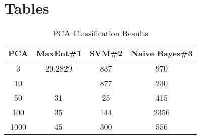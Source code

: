 \documentclass[]{article}
\title{}
\author{Sullivan, Cellier, Hobbs}
\begin{document}
\maketitle

\begin{abstract}

\end{abstract}

\section{Tables}
\begin{table}[ht] 
\caption{PCA Classification Results} %
\centering %
\begin{tabular}{c c c c} %
\hline\hline %
PCA & MaxEnt\#1 & SVM\#2 & Naive Bayes\#3 \\ [0.5ex] %
\hline %
3 & 29.2829 & 837 & 970 \\ %
10 &  & 877 & 230 \\ 
50 & 31 & 25 & 415 \\ 
100 & 35 & 144 & 2356 \\ 
1000 & 45 & 300 & 556 \\ [1ex] %
\hline %
\end{tabular} 
\label{table:nonlin} %
\end{table} 
\end{document}
